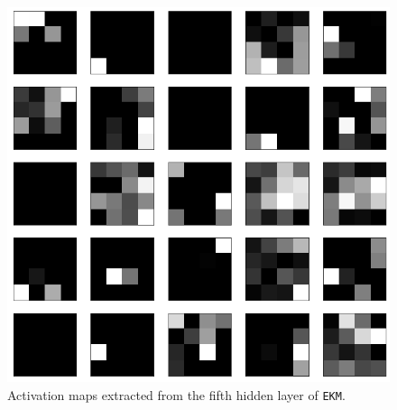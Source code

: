\documentclass[aps,twocolumn,secnumarabic,nobalancelastpage,amsmath,amssymb,
nofootinbib]{revtex4}
\begin{document}
\begin{figure}[h!]
	\centering
	\includegraphics[width=0.6\linewidth]{Images/FeatureMaps2}
	
	\caption{Activation maps extracted from the fifth hidden layer of \texttt{EKM}.}
	\label{fig:fm2}
\end{figure}

\pagebreak

\nocite{*}

\end{document}
